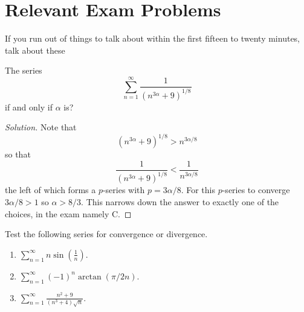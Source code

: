 \chapter{Relevant Exam Problems}
If you run out of things to talk about within the first fifteen to twenty
minutes, talk about these
\begin{problem}
The series
\[
\sum_{n=1}^\infty\frac{1}{\left( n^{3\alpha}+9 \right)^{1/8}}
\]
if and only if $\alpha$ is?
\end{problem}
\begin{proof}[Solution]
Note that
\[
(n^{3\alpha}+9)^{1/8}>n^{3\alpha/8}
\]
so that
\[
\frac{1}{(n^{3\alpha}+9)^{1/8}}<\frac{1}{n^{3\alpha/8}}
\]
the left of which forms a $p$-series with $p=3\alpha/8$. For this
$p$-series to converge $3\alpha/8>1$ so $\alpha>8/3$. This narrows down the
answer to exactly one of the choices, in the exam namely C.
\end{proof}
\begin{problem}
Test the following series for convergence or divergence.
\begin{enumerate}[label=(\alph*)]
\item $\displaystyle\sum_{n=1}^\infty n\sin\left(\frac{1}{n}\right)$.
\item $\displaystyle\sum_{n=1}^\infty(-1)^n\arctan(\pi/2n)$.
\item $\displaystyle\sum_{n=1}^\infty\frac{n^2+9}{(n^3+4)\sqrt{n}}$.
\end{enumerate}
\end{problem}
